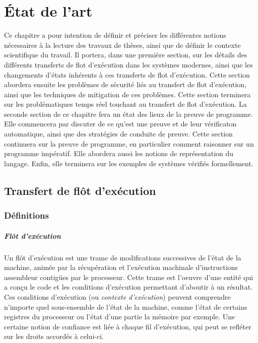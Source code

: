 \chapter{État de l'art}

	Ce chapitre a pour intention de définir et préciser les différentes notions nécessaires à la lecture des travaux de thèses, ainsi que de définir le contexte scientifique du travail. Il portera, dans une première section, sur les détails des différents transferts de flot d'exécution dans les systèmes modernes, ainsi que les changements d'états inhérents à ces transferts de flot d'exécution. Cette section abordera ensuite les problèmes de sécurité liés au transfert de flot d'exécution, ainsi que les techniques de mitigation de ces problèmes. Cette section terminera sur les problématiques temps réel touchant au transfert de flot d'exécution.
	La seconde section de ce chapitre fera un état des lieux de la preuve de programme. Elle commencera par discuter de ce qu'est une preuve et de leur vérificaton automatique, ainsi que des stratégies de conduite de preuve. Cette section continuera sur la preuve de programme, en particulier comment raisonner sur un programme impératif. Elle abordera aussi les notions de représentation du langage. Enfin, elle terminera sur les exemples de systèmes vérifiés formellement.

	\section{Transfert de flôt d'exécution}
	\label{control_flow_transfer}

		\subsection{Définitions}

		\paragraph{Flôt d'exécution}

\label{context}
			Un flôt d'exécution est une trame de modifications successives de l'état de la machine, animée par la récupération et l'exécution machinale d'instructions assembleur contigües par le processeur. Cette trame est l'oeuvre d'une entité qui a conçu le code et les conditions d'exécution permettant d'aboutir à un résultat. Ces conditions d'exécution (ou \emph{contexte d'exécution}) peuvent comprendre n'importe quel sous-ensemble de l'état de la machine, comme l'état de certains registres du processeur ou l'état d'une partie la mémoire par exemple. Une certaine notion de confiance est liée à chaque fil d'exécution, qui peut se refléter sur les droits accordés à celui-ci.

